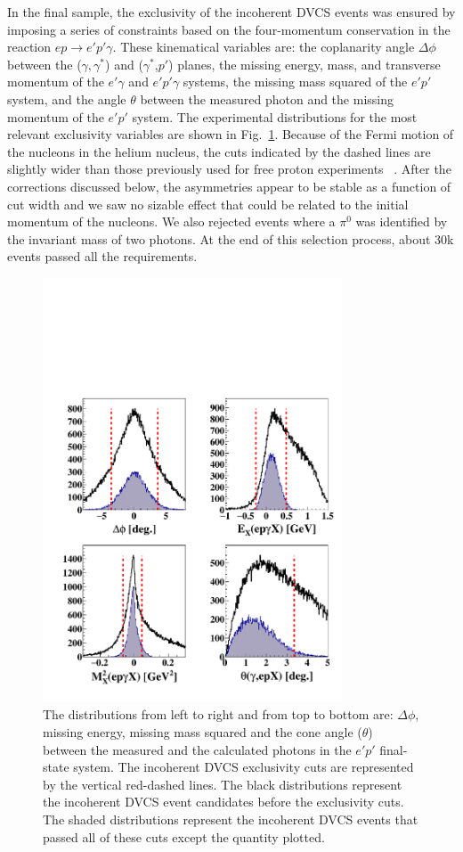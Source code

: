 \documentclass[twocolumn,nofootinbib,prl,superscriptaddress,secnumarabic,amssymb,nobibnotes,aps,floatfix]{revtex4}
\begin{document}
In the final sample, the exclusivity of the incoherent DVCS events was ensured 
by imposing a series of constraints based on the four-momentum conservation in 
the reaction $ep\rightarrow e'p'\gamma$.  These kinematical variables are: the 
coplanarity angle $\Delta\phi$ between the ($\gamma,\gamma^*$) and 
($\gamma^*$,$p'$) planes, the missing energy, mass, and transverse momentum of 
the $e'\gamma$ and $e'p'\gamma$ systems, the missing mass squared of the $e'p'$ 
system, and the angle $\theta$ between the measured photon and the missing 
momentum of the $e'p'$ system. The experimental distributions for the most relevant 
exclusivity variables are shown in Fig.~\ref{fig:kin-cuts}.  Because of the 
Fermi motion of the nucleons in the helium nucleus, the cuts indicated by the dashed lines
are slightly wider than those previously used for free proton experiments~%
\cite{Girod:2007aa}. After the corrections discussed below, the asymmetries 
appear to be stable as a function of cut width and we saw no sizable effect 
that could be related to the initial momentum of the nucleons. We also rejected 
events where a $\pi^0$ was identified by the invariant mass of two photons. At the end of this selection 
process, about 30k events passed all the requirements. 

\begin{figure}[tb]
\includegraphics[width=8.9cm]{incoh_exc_cuts_final.pdf}
\caption{The distributions from left to right and from top to bottom are: 
   $\Delta \phi$, missing energy, missing mass squared and the cone angle 
   ($\theta$) between the measured and the calculated photons in the $e'p'$ 
   final-state system. The incoherent DVCS exclusivity cuts are represented by 
   the vertical red-dashed lines. The black distributions represent the 
   incoherent DVCS event candidates before the exclusivity cuts. The shaded 
   distributions represent the incoherent DVCS events that passed all of these 
   cuts except the quantity plotted.}
\label{fig:kin-cuts}
\end{figure}
\end{document}

